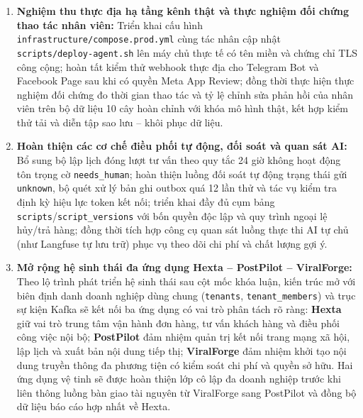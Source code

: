 \begin{enumerate}
  \item \textbf{Nghiệm thu thực địa hạ tầng kênh thật và thực nghiệm đối chứng thao tác nhân viên:} Triển khai cấu hình \texttt{infrastructure/\hspace{0pt}compose.\hspace{0pt}prod.\hspace{0pt}yml} cùng tác nhân cập nhật \texttt{scripts/\hspace{0pt}deploy-\hspace{0pt}agent.\hspace{0pt}sh} lên máy chủ thực tế có tên miền và chứng chỉ TLS công cộng; hoàn tất kiểm thử webhook thực địa cho Telegram Bot và Facebook Page sau khi có quyền Meta App Review; đồng thời thực hiện thực nghiệm đối chứng đo thời gian thao tác và tỷ lệ chỉnh sửa phản hồi của nhân viên trên bộ dữ liệu 10 cây hoàn chỉnh với khóa mô hình thật, kết hợp kiểm thử tải và diễn tập sao lưu -- khôi phục dữ liệu.
  \item \textbf{Hoàn thiện các cơ chế điều phối tự động, đối soát và quan sát AI:} Bổ sung bộ lập lịch đóng lượt tư vấn theo quy tắc 24 giờ không hoạt động tôn trọng cờ \texttt{needs\_\hspace{0pt}human}; hoàn thiện luồng đối soát tự động trạng thái gửi \texttt{unknown}, bộ quét xử lý bản ghi outbox quá 12 lần thử và tác vụ kiểm tra định kỳ hiệu lực token kết nối; triển khai đầy đủ cụm bảng \texttt{scripts}/\hspace{0pt}\texttt{script\_\hspace{0pt}versions} với bốn quyền độc lập và quy trình ngoại lệ hủy/\hspace{0pt}trả hàng; đồng thời tích hợp công cụ quan sát luồng thực thi AI tự chủ (như Langfuse tự lưu trữ) phục vụ theo dõi chi phí và chất lượng gợi ý.
  \item \textbf{Mở rộng hệ sinh thái đa ứng dụng Hexta -- PostPilot -- ViralForge:} Theo lộ trình phát triển hệ sinh thái sau cột mốc khóa luận, kiến trúc mở với biên định danh doanh nghiệp dùng chung (\texttt{tenants}, \texttt{tenant\_\hspace{0pt}members}) và trục sự kiện Kafka sẽ kết nối ba ứng dụng có vai trò phân tách rõ ràng: \textbf{Hexta} giữ vai trò trung tâm vận hành đơn hàng, tư vấn khách hàng và điều phối công việc nội bộ; \textbf{PostPilot} đảm nhiệm quản trị kết nối trang mạng xã hội, lập lịch và xuất bản nội dung tiếp thị; \textbf{ViralForge} đảm nhiệm khởi tạo nội dung truyền thông đa phương tiện có kiểm soát chi phí và quyền sở hữu. Hai ứng dụng vệ tinh sẽ được hoàn thiện lớp cô lập đa doanh nghiệp trước khi liên thông luồng bàn giao tài nguyên từ ViralForge sang PostPilot và đồng bộ dữ liệu báo cáo hợp nhất về Hexta.
\end{enumerate}
